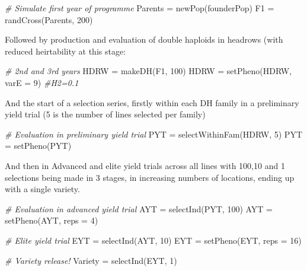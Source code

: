 \documentclass[
]{book}
\newenvironment{Shaded}{\begin{snugshade}}{\end{snugshade}}
\newcommand{\AttributeTok}[1]{\textcolor[rgb]{0.77,0.63,0.00}{#1}}
\newcommand{\CommentTok}[1]{\textcolor[rgb]{0.56,0.35,0.01}{\textit{#1}}}
\newcommand{\DecValTok}[1]{\textcolor[rgb]{0.00,0.00,0.81}{#1}}
\newcommand{\FunctionTok}[1]{\textcolor[rgb]{0.00,0.00,0.00}{#1}}
\newcommand{\NormalTok}[1]{#1}
\newcommand{\OtherTok}[1]{\textcolor[rgb]{0.56,0.35,0.01}{#1}}
\begin{document}
\begin{Shaded}
\begin{Highlighting}[]
\CommentTok{\# Simulate first year of programme}
\NormalTok{Parents }\OtherTok{=} \FunctionTok{newPop}\NormalTok{(founderPop)}
\NormalTok{F1 }\OtherTok{=} \FunctionTok{randCross}\NormalTok{(Parents, }\DecValTok{200}\NormalTok{)}
\end{Highlighting}
\end{Shaded}

Followed by production and evaluation of double haploids in headrows (with reduced heirtability at this stage:

\begin{Shaded}
\begin{Highlighting}[]
\CommentTok{\# 2nd and 3rd years}
\NormalTok{HDRW }\OtherTok{=} \FunctionTok{makeDH}\NormalTok{(F1, }\DecValTok{100}\NormalTok{)}
\NormalTok{HDRW }\OtherTok{=} \FunctionTok{setPheno}\NormalTok{(HDRW, }\AttributeTok{varE =} \DecValTok{9}\NormalTok{)  }\CommentTok{\#H2=0.1}
\end{Highlighting}
\end{Shaded}

And the start of a selection series, firstly within each DH family in a preliminary yield trial (5 is the number of lines selected per family)

\begin{Shaded}
\begin{Highlighting}[]
\CommentTok{\# Evaluation in preliminary yield trial}
\NormalTok{PYT }\OtherTok{=} \FunctionTok{selectWithinFam}\NormalTok{(HDRW, }\DecValTok{5}\NormalTok{)}
\NormalTok{PYT }\OtherTok{=} \FunctionTok{setPheno}\NormalTok{(PYT)}
\end{Highlighting}
\end{Shaded}

And then in Advanced and elite yield trials across all lines with 100,10 and 1 selections being made in 3 stages, in increasing numbers of locations, ending up with a single variety.

\begin{Shaded}
\begin{Highlighting}[]
\CommentTok{\# Evaluation in advanced yield trial}
\NormalTok{AYT }\OtherTok{=} \FunctionTok{selectInd}\NormalTok{(PYT, }\DecValTok{100}\NormalTok{)}
\NormalTok{AYT }\OtherTok{=} \FunctionTok{setPheno}\NormalTok{(AYT, }\AttributeTok{reps =} \DecValTok{4}\NormalTok{)}

\CommentTok{\# Elite yield trial}
\NormalTok{EYT }\OtherTok{=} \FunctionTok{selectInd}\NormalTok{(AYT, }\DecValTok{10}\NormalTok{)}
\NormalTok{EYT }\OtherTok{=} \FunctionTok{setPheno}\NormalTok{(EYT, }\AttributeTok{reps =} \DecValTok{16}\NormalTok{)}

\CommentTok{\# Variety release!}
\NormalTok{Variety }\OtherTok{=} \FunctionTok{selectInd}\NormalTok{(EYT, }\DecValTok{1}\NormalTok{)}
\end{Highlighting}
\end{Shaded}
\end{document}
